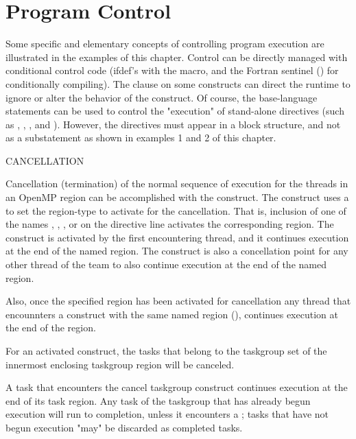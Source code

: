 \pagebreak
\chapter{Program Control}
\label{sec:program_control}

Some specific and elementary concepts of controlling program execution are
illustrated in the examples of this chapter.  Control can be directly
managed with conditional control code (ifdef's with the  
macro, and the Fortran sentinel (\code{!\$}) 
for conditionally compiling). The  clause on some constructs
can direct the runtime to ignore or alter the behavior of the construct.
Of course, the base-language  statements can be used to control the "execution" 
of stand-alone directives (such as , , , 
and  ).
However, the directives must appear in a block structure, and not as a substatement as shown in examples 1 and 2 of this chapter.

\bigskip
CANCELLATION

Cancellation (termination) of the normal sequence of execution for the threads in an OpenMP region can
be  accomplished with the  construct.  The construct uses a
 to set the region-type to activate for the cancellation. 
That is, inclusion  of one of the  names , , 
,  or  on the directive line 
activates the corresponding region.  
The  construct is activated by the first encountering thread,  and it
continues execution at the end of the named region.
The  construct is also a concellation point for any other thread of the team 
to also continue execution at the end of the named region.  

Also, once the specified region has been activated for cancellation any thread that encounnters 
a  construct with the same named region (),
continues execution at the end of the region.

For an activated  construct, the tasks that
belong to the taskgroup set of the innermost enclosing taskgroup region will be canceled. 

A task that encounters the cancel taskgroup construct continues execution at the end of its
task region. Any task of the taskgroup that has already begun execution will run to completion,
unless it encounters a ; tasks that have not begun execution "may" be
discarded as completed tasks.

